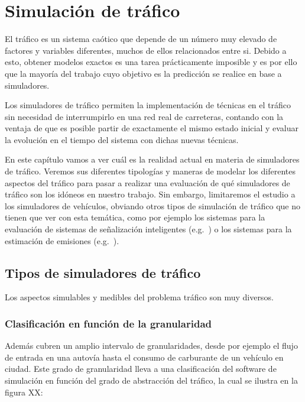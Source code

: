 \chapter{Simulación de tráfico}
\label{ch:sota-traffic-simulation}

El tráfico es un sistema caótico que depende de un número muy elevado de factores y variables diferentes, muchos de ellos relacionados entre si. Debido a esto, obtener modelos exactos es una tarea prácticamente imposible y es por ello que la mayoría del trabajo cuyo objetivo es la predicción se realice en base a simuladores.

Los simuladores de tráfico permiten la implementación de técnicas en el tráfico sin necesidad de interrumpirlo en una red real de carreteras, contando con la ventaja de que es posible partir de exactamente el mismo estado inicial y evaluar la evolución en el tiempo del sistema con dichas nuevas técnicas.

En este capítulo vamos a ver cuál es la realidad actual en materia de simuladores de tráfico. Veremos sus diferentes tipologías y maneras de modelar los diferentes aspectos del tráfico para pasar a realizar una evaluación de qué simuladores de tráfico son los idóneos en nuestro trabajo. Sin embargo, limitaremos el estudio a los simuladores de vehículos, obviando otros tipos de simulación de tráfico que no tienen que ver con esta temática, como por ejemplo los sistemas para la evaluación de sistemas de señalización inteligentes (e.g.~\cite{jin2016evaluation}) o los sistemas para la estimación de emisiones (e.g.~\cite{quaassdorff2016microscale}).

\section{Tipos de simuladores de tráfico}

Los aspectos simulables y medibles del problema tráfico son muy diversos.

\subsection{Clasificación en función de la granularidad}

Además cubren un amplio intervalo de granularidades, desde por ejemplo el flujo de entrada en una autovía hasta el consumo de carburante de un vehículo en ciudad. Este grado de granularidad lleva a una clasificación del software de simulación en función del grado de abstracción del tráfico, la cual se ilustra en la figura XX:


